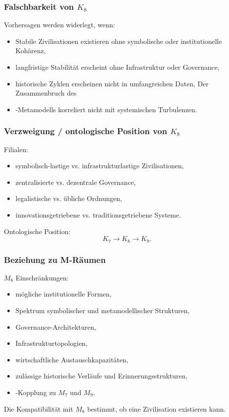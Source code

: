 \subsubsection{Falschbarkeit von \texorpdfstring{$K_8$}{K_8}}

Vorhersagen werden widerlegt, wenn:
\begin{itemize}
    \item Stabile Zivilisationen existieren ohne symbolische oder institutionelle Kohärenz,
    \item langfristige Stabilität erscheint ohne Infrastruktur oder Governance,
    \item historische Zyklen erscheinen nicht in umfangreichen Daten,
    Der Zusammenbruch des \item-Metamodells korreliert nicht mit systemischen Turbulenzen.
\end{itemize}

\subsubsection{Verzweigung / ontologische Position von \texorpdfstring{$K_8$}{K_8}}

Filialen:
\begin{itemize}
    \item symbolisch-lastige vs. infrastrukturlastige Zivilisationen,
    \item zentralisierte vs. dezentrale Governance,
    \item legalistische vs. übliche Ordnungen,
    \item innovationsgetriebene vs. traditionsgetriebene Systeme.
\end{itemize}

Ontologische Position:
\[
K_7 \to K_8 \to K_9.
\]

\subsubsection{Beziehung zu M-Räumen}

$M_8$ Einschränkungen:
\begin{itemize}
    \item mögliche institutionelle Formen,
    \item Spektrum symbolischer und metamodellischer Strukturen,
    \item Governance-Architekturen,
    \item Infrastrukturtopologien,
    \item wirtschaftliche Austauschkapazitäten,
    \item zulässige historische Verläufe und Erinnerungsstrukturen,
    \item-Kopplung zu $M_7$ und $M_9$.
\end{itemize}

Die Kompatibilität mit $M_8$ bestimmt, ob eine Zivilisation existieren kann.
